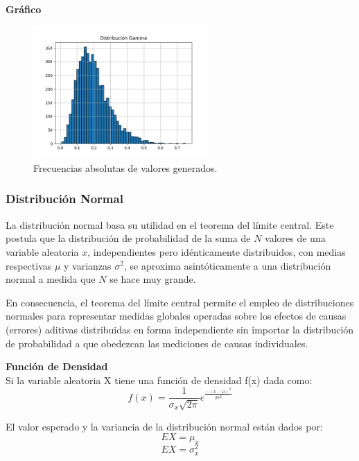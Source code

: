 \documentclass[11pt]{article}
\begin{document}
\newpage
\noindent\textbf{Gráfico}\\
\begin{figure}[h]
    \centering
    \includegraphics[width=0.6\textwidth]{Images/histograma_gamma.png}
    \caption{Frecuencias absolutas de valores generados.}
  \end{figure}

\subsubsection{Distribución Normal}
La distribución normal basa su utilidad en el teorema del límite central. Este postula que la distribución de probabilidad de la suma de \( N \) valores de una variable aleatoria \( x \), independientes pero idénticamente distribuidos, con medias respectivas \( \mu \) y varianzas \( \sigma^2 \), se aproxima asintóticamente a una distribución normal a medida que \( N \) se hace muy grande.


En consecuencia, el teorema del límite central permite el empleo de distribuciones normales para representar medidas globales operadas sobre los efectos de causas (errores) aditivas distribuidas en forma independiente sin importar la distribución de probabilidad a que obedezcan las mediciones de causas individuales. 

\noindent\textbf{Función de Densidad}\\
Si la variable aleatoria X tiene una función de densidad f(x) dada como:
\begin{equation}
f(x) = \frac{1}{\sigma_{x}\sqrt{2\pi}} e^{\frac{-(x - \mu)^2}{2\sigma^2}}
\end{equation}

El valor esperado y la variancia de la distribución normal están dados por:
  \begin{equation}
    EX = \mu_{x}
  \end{equation}
  \begin{equation}
    EX = \sigma_{x}^2
  \end{equation}
\end{document}

